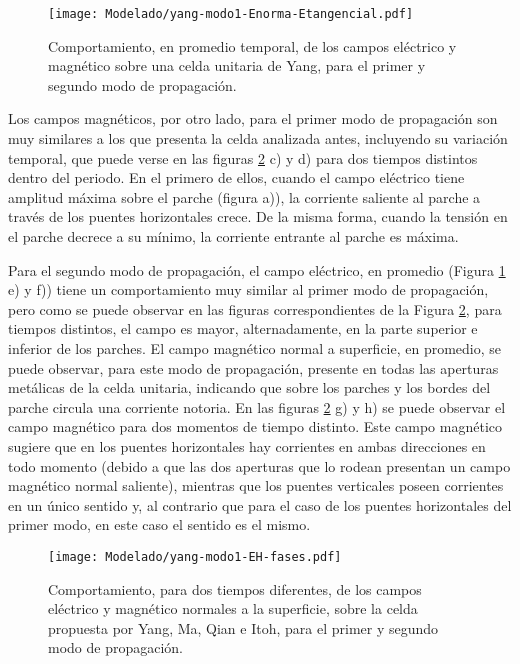 \begin{figure}[h]
	\centering
	\texttt{[image: Modelado/yang-modo1-Enorma-Etangencial.pdf]}
	\caption{Comportamiento, en promedio temporal, de los campos eléctrico y magnético sobre una celda unitaria de Yang, para el primer y segundo modo de propagación.}
	\label{fig:yang-analisis-campos}
\end{figure}

Los campos magnéticos, por otro lado, para el primer modo de propagación son muy similares a los que presenta la celda analizada antes, incluyendo su variación temporal, que puede verse en las figuras \ref{fig:yang-analisis-campos-fases} c) y d) para dos tiempos distintos dentro del periodo. En el primero de ellos, cuando el campo eléctrico tiene amplitud máxima sobre el parche (figura a)), la corriente saliente al parche a través de los puentes horizontales crece. De la misma forma, cuando la tensión en el parche decrece a su mínimo, la corriente entrante al parche es máxima.

Para el segundo modo de propagación, el campo eléctrico, en promedio (Figura \ref{fig:yang-analisis-campos} e) y f)) tiene un comportamiento muy similar al primer modo de propagación, pero como se puede observar en las figuras correspondientes de la Figura \ref{fig:yang-analisis-campos-fases}, para tiempos distintos, el campo es mayor, alternadamente, en la parte superior e inferior de los parches. El campo magnético normal a superficie, en promedio, se puede observar, para este modo de propagación, presente en todas las aperturas metálicas de la celda unitaria, indicando que sobre los parches y los bordes del parche circula una corriente notoria. En las figuras \ref{fig:yang-analisis-campos-fases} g) y h) se puede observar el campo magnético para dos momentos de tiempo distinto. Este campo magnético sugiere que en los puentes horizontales hay corrientes en ambas direcciones en todo momento (debido a que las dos aperturas que lo rodean presentan un campo magnético normal saliente), mientras que los puentes verticales poseen corrientes en un único sentido y, al contrario que para el caso de los puentes horizontales del primer modo, en este caso el sentido es el mismo.

\begin{figure}[h]
	\centering
	\texttt{[image: Modelado/yang-modo1-EH-fases.pdf]}
	\caption{Comportamiento, para dos tiempos diferentes, de los campos eléctrico y magnético normales a la superficie, sobre la celda propuesta por Yang, Ma, Qian e Itoh, para el primer y segundo modo de propagación.}
	\label{fig:yang-analisis-campos-fases}
\end{figure}



